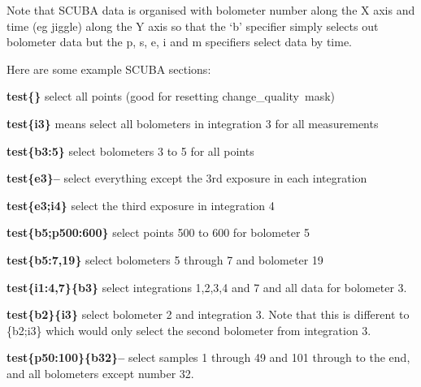 \documentclass[twoside,11pt]{article}
\newcommand{\task}[1]{{\sf #1}}
\newcommand{\chgqual}{\htmlref{\task{change\_quality}}{CHANGE_QUALITY}}
\newcommand{\htmlref}[2]{#1}
\begin{document}
Note that SCUBA data is organised with bolometer number along the 
X axis and time (eg jiggle) along the Y axis so  that the `b' specifier
simply selects out bolometer data but the p, s, e, i and m specifiers select
data by time.

Here are some example SCUBA sections:

\begin{description} 

\item \textbf{test\{\}} \newline
          select all points (good for resetting \chgqual\
          mask)

\item \textbf{test\{i3\}} \newline
          means select all bolometers in integration 3 for all
          measurements
 
\item \textbf{test\{b3:5\}} \newline
          select bolometers 3 to 5 for all points
 
\item \textbf{test\{e3\}--} \newline
    select everything except the 3rd exposure in each integration

\item \textbf{test\{e3;i4\}}  \newline
    select the third exposure in integration 4

\item \textbf{test\{b5;p500:600\}} \newline
    select points 500 to 600 for bolometer 5

\item \textbf{test\{b5:7,19\}}   \newline
    select bolometers 5 through 7 and bolometer 19

\item \textbf{test\{i1:4,7\}\{b3\}} \newline
    select integrations 1,2,3,4 and 7 and all data for
    bolometer 3.

\item \textbf{test\{b2\}\{i3\}}\newline
    select bolometer 2 and integration 3. Note that this
    is different to \{b2;i3\} which would only select the second
    bolometer from integration 3.

\item \textbf{test\{p50:100\}\{b32\}--}\newline
    select samples 1 through 49 and 101 through to the end, and
    all bolometers except number 32.

\end{description}
\end{document}
